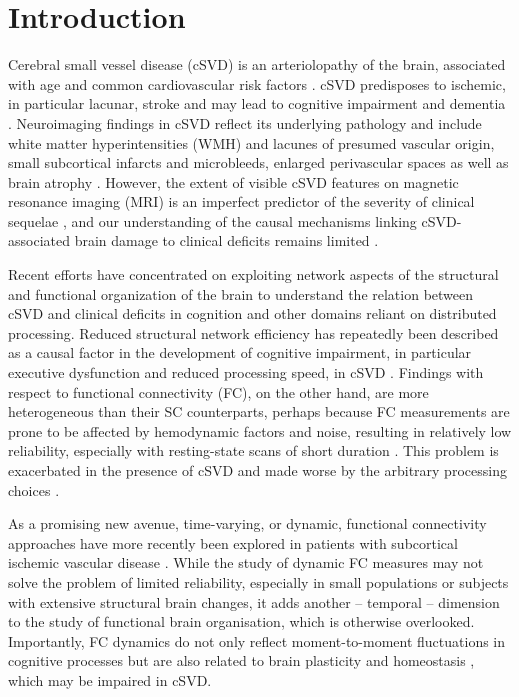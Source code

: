 \section{Introduction} \label{intro}
Cerebral small vessel disease (cSVD) is an arteriolopathy of the brain, associated with age and common cardiovascular risk factors \citep{Wardlaw2013-yd}.
cSVD predisposes to ischemic, in particular lacunar, stroke and may lead to cognitive impairment and dementia \citep{Cannistraro2019-ly}.
Neuroimaging findings in cSVD reflect its underlying pathology \citep{Wardlaw2015-ri} and include white matter hyperintensities (WMH) and lacunes of presumed vascular origin, small subcortical infarcts and microbleeds, enlarged perivascular spaces as well as brain atrophy \citep{Wardlaw2013-sc}.
However, the extent of visible cSVD features on magnetic resonance imaging (MRI) is an imperfect predictor of the severity of clinical sequelae \citep{Das2019-pc}, and our understanding of the causal mechanisms linking cSVD-associated brain damage to clinical deficits remains limited \citep{Bos2018-qj}.

Recent efforts have concentrated on exploiting network aspects of the structural \citep{Tuladhar2016-ae,Tuladhar2020-fp,Lawrence2018-ti} and functional \citep{Dey2016-qg,Schulz2021-ho} organization of the brain to understand the relation between cSVD and clinical deficits in cognition and other domains reliant on distributed processing.
Reduced structural network efficiency has repeatedly been described as a causal factor in the development of cognitive impairment, in particular executive dysfunction and reduced processing speed, in cSVD \citep{Lawrence2014-xp,Shen2020-yv,Reijmer2016-wm,Prins2005-ej}.
Findings with respect to functional connectivity (FC), on the other hand, are more heterogeneous than their SC counterparts, perhaps because FC measurements are prone to be affected by hemodynamic factors and noise, resulting in relatively low reliability, especially with resting-state scans of short duration \citep{laumann2015functional}. 
This problem is exacerbated in the presence of cSVD and made worse by the arbitrary processing choices \citep{Lawrence2018-sv,Gesierich2020-db}.

As a promising new avenue, time-varying, or dynamic, functional connectivity approaches have more recently been explored in patients with subcortical ischemic vascular disease \citep{Yin2022-cv,Xu2021-ib}. 
While the study of dynamic FC measures may not solve the problem of limited reliability, especially in small populations or subjects with extensive structural brain changes, it adds another -- temporal -- dimension to the study of functional brain organisation, which is otherwise overlooked.
Importantly, FC dynamics do not only reflect moment-to-moment fluctuations in cognitive processes but are also related to brain plasticity and homeostasis , which may be impaired in cSVD.

